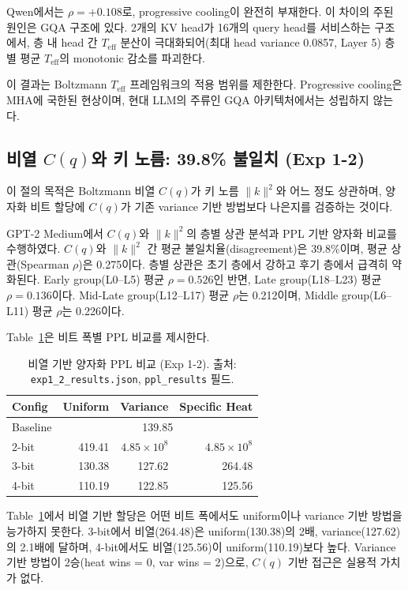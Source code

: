 \documentclass[11pt,a4paper]{article}
\newcommand{\teff}{T_\mathrm{eff}}
\newcommand{\Cq}{C(q)}
\newcommand{\knorm}{\|k\|^2}
\begin{document}
Qwen에서는 $\rho = +0.108$로, progressive cooling이 완전히 부재한다.
이 차이의 주된 원인은 GQA 구조에 있다.
2개의 KV head가 16개의 query head를 서비스하는 구조에서, 층 내 head 간 $\teff$ 분산이 극대화되어(최대 head variance 0.0857, Layer 5) 층별 평균 $\teff$의 monotonic 감소를 파괴한다.

이 결과는 Boltzmann $\teff$ 프레임워크의 적용 범위를 제한한다.
Progressive cooling은 MHA에 국한된 현상이며, 현대 LLM의 주류인 GQA 아키텍처에서는 성립하지 않는다.

\subsection{비열 $\Cq$와 키 노름: 39.8\% 불일치 (Exp 1-2)}
\label{sec:exp12}

이 절의 목적은 Boltzmann 비열 $\Cq$가 키 노름 $\knorm$와 어느 정도 상관하며, 양자화 비트 할당에 $\Cq$가 기존 variance 기반 방법보다 나은지를 검증하는 것이다.

GPT-2 Medium에서 $\Cq$와 $\knorm$의 층별 상관 분석과 PPL 기반 양자화 비교를 수행하였다.
$\Cq$와 $\knorm$ 간 평균 불일치율(disagreement)은 39.8\%이며, 평균 상관(Spearman $\rho$)은 0.275이다.
층별 상관은 초기 층에서 강하고 후기 층에서 급격히 약화된다.
Early group(L0--L5) 평균 $\rho = 0.526$인 반면, Late group(L18--L23) 평균 $\rho = 0.136$이다.
Mid-Late group(L12--L17) 평균 $\rho$는 0.212이며, Middle group(L6--L11) 평균 $\rho$는 0.226이다.

Table~\ref{tab:exp12_ppl}은 비트 폭별 PPL 비교를 제시한다.

\begin{table}[H]
\centering
\caption{비열 기반 양자화 PPL 비교 (Exp 1-2). 출처: \texttt{exp1\_2\_results.json}, \texttt{ppl\_results} 필드.}
\label{tab:exp12_ppl}
\begin{tabular}{lrrr}
\toprule
\textbf{Config} & \textbf{Uniform} & \textbf{Variance} & \textbf{Specific Heat} \\
\midrule
Baseline & \multicolumn{3}{c}{139.85} \\
2-bit & 419.41 & $4.85 \times 10^{8}$ & $4.85 \times 10^{8}$ \\
3-bit & 130.38 & 127.62 & 264.48 \\
4-bit & 110.19 & 122.85 & 125.56 \\
\bottomrule
\end{tabular}
\end{table}

Table~\ref{tab:exp12_ppl}에서 비열 기반 할당은 어떤 비트 폭에서도 uniform이나 variance 기반 방법을 능가하지 못한다.
3-bit에서 비열(264.48)은 uniform(130.38)의 2배, variance(127.62)의 2.1배에 달하며, 4-bit에서도 비열(125.56)이 uniform(110.19)보다 높다.
Variance 기반 방법이 2승(heat wins = 0, var wins = 2)으로, $\Cq$ 기반 접근은 실용적 가치가 없다.
\end{document}
